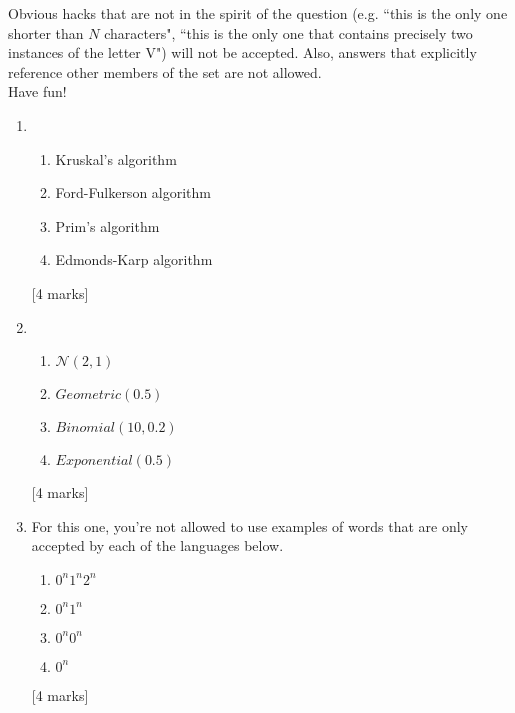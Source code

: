\documentclass[12pt, a4paper]{article}
\begin{document}
\noindent Obvious hacks that are not in the spirit of the question (e.g. ``this is the only one shorter than $N$ characters", ``this is the only one that contains precisely two instances of the letter V") will not be accepted. Also, answers that explicitly reference other members of the set are not allowed. \\[12pt]
\noindent Have fun!

\begin{enumerate}
\item 
\begin{enumerate}
\item Kruskal's algorithm
\item Ford-Fulkerson algorithm
\item Prim's algorithm
\item Edmonds-Karp algorithm
\end{enumerate}
[4 marks]

\item
\begin{enumerate}
\item $\mathcal{N}(2, 1)$
\item $Geometric(0.5)$
\item $Binomial(10, 0.2)$
\item $Exponential(0.5)$
\end{enumerate}
[4 marks]

\item
For this one, you're not allowed to use examples of words that are only accepted by each of the languages below.
\begin{enumerate}
\item $0^n 1^n 2^n$
\item $0^n 1^n$
\item $0^n 0^n$
\item $0^n$
\end{enumerate}
[4 marks]


\end{enumerate}
\end{document}
